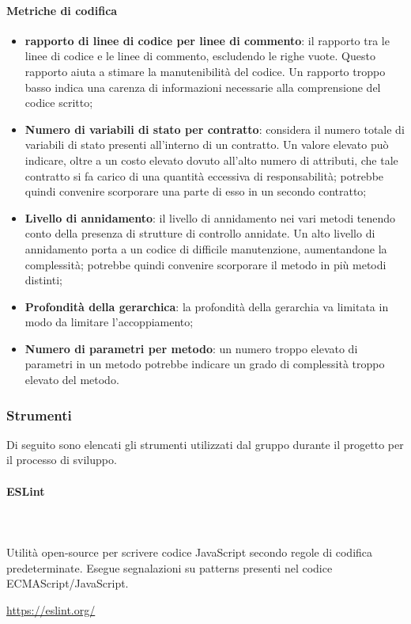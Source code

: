 		\paragraph{Metriche di codifica}
			\begin{itemize}
				\item \textbf{rapporto di linee di codice per linee di commento}: il rapporto tra le linee di codice e le linee di commento, escludendo le righe vuote. Questo rapporto aiuta a stimare la manutenibilità del codice. Un rapporto troppo basso indica una carenza di informazioni	necessarie alla comprensione del codice scritto;
				\item \textbf{Numero di variabili di stato per contratto}: considera il numero totale di variabili di stato presenti all'interno di un contratto. Un valore elevato può indicare, oltre a un costo elevato dovuto all'alto numero di attributi, che tale contratto si fa carico di una quantità eccessiva di responsabilità; potrebbe quindi convenire scorporare una parte di esso in un secondo contratto;
				\item \textbf{Livello di annidamento}: il livello di annidamento nei vari metodi tenendo	conto della presenza di strutture di controllo annidate.  Un alto livello di annidamento porta a un codice di difficile manutenzione, aumentandone la complessità; potrebbe quindi convenire scorporare il metodo in più metodi distinti;
				\item \textbf{Profondità della gerarchica}: la profondità della gerarchia va limitata in modo da limitare l'accoppiamento;
				\item \textbf{Numero di parametri per metodo}: un numero troppo elevato di parametri in un metodo potrebbe indicare un grado di complessità troppo elevato del metodo.
			\end{itemize}
			
	\subsubsection{Strumenti}
	Di seguito sono elencati gli strumenti utilizzati dal gruppo durante il 
	progetto per il processo di sviluppo.
			
		\paragraph{ESLint} \mbox{}\\ \mbox{}\\
		Utilità open-source per scrivere codice JavaScript secondo regole di codifica 
		predeterminate. Esegue segnalazioni su patterns presenti nel codice 
		ECMAScript/JavaScript.\\
		\centerline{\url{https://eslint.org/}}
				
